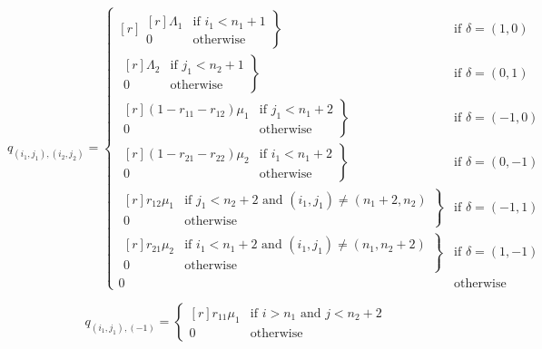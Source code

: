 \documentclass{article}
\begin{document}
\begin{equation}
  q_{(i_1, j_1),(i_2, j_2)} = \left\{
  \begin{matrix*}[ r ]
    \left. \begin{matrix*}[ r ]
      \Lambda_1 & \text{if } i_1 < n_1 + 1 \\
      0 & \text{otherwise}
    \end{matrix*} \right\} & \text{if } \delta = (1, 0) \\
    \left. \begin{matrix*}[ r ]
      \Lambda_2 & \text{if } j_1 < n_2 + 1 \\
      0 & \text{otherwise}
    \end{matrix*} \right\} & \text{if } \delta = (0, 1) \\
    \left. \begin{matrix*}[ r ]
      (1 - r_{11} - r_{12})\mu_1 & \text{if } j_1 < n_1 + 2 \\
      0 & \text{otherwise}
    \end{matrix*} \right\} & \text{if } \delta = (-1, 0) \\
    \left. \begin{matrix*}[ r ]
      (1 - r_{21} - r_{22})\mu_2 & \text{if } i_1 < n_1 + 2 \\
      0 & \text{otherwise}
    \end{matrix*} \right\} & \text{if } \delta = (0, -1) \\
    \left. \begin{matrix*}[ r ]
      r_{12}\mu_1 & \text{if } j_1 < n_2 + 2 \text{ and } (i_1, j_1) \neq (n_1 + 2, n_2) \\
      0 & \text{otherwise}
    \end{matrix*} \right\} & \text{if } \delta = (-1, 1) \\
    \left. \begin{matrix*}[ r ]
      r_{21}\mu_2 & \text{if } i_1 < n_1 + 2 \text{ and } (i_1, j_1) \neq (n_1, n_2 + 2) \\
      0 & \text{otherwise}
    \end{matrix*} \right\} & \text{if } \delta = (1, -1) \\
    0 & \text{otherwise}
  \end{matrix*} \right.
\end{equation}

\begin{equation}\label{equ:todeadlock2}
  q_{(i_1, j_1), (-1)} = \left\{
  \begin{matrix*}[ r ]
    r_{11}\mu_1 & \text{if } i > n_1 \text{ and } j < n_2 + 2 \\
    0 & \text{otherwise}
  \end{matrix*}
  \right.
\end{equation}
\end{document}
